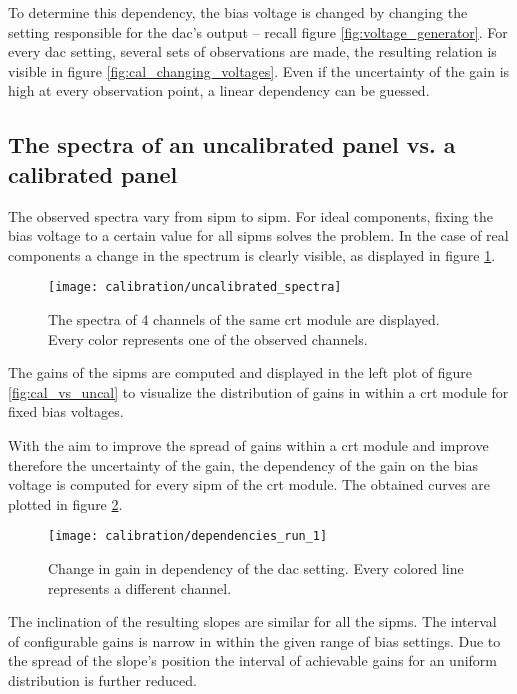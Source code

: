 To determine this dependency, the bias voltage is changed by changing the setting responsible for the \gls{dac}'s output -- recall figure \ref{fig:voltage_generator}.
For every \gls{dac} setting, several sets of observations are made, the resulting relation is visible in figure \ref{fig:cal_changing_voltages}.
Even if the uncertainty of the gain is high at every observation point, a linear dependency can be guessed.

\subsection{The spectra of an uncalibrated panel vs. a calibrated panel}

The observed spectra vary from \gls{sipm} to \gls{sipm}.
For ideal components, fixing the bias voltage to a certain value for all \glspl{sipm} solves the problem.
In the case of real components a change in the spectrum is clearly visible, as displayed in figure \ref{fig:cal_uncalibrated_spectra}.

\begin{figure}
  \centering
  \texttt{[image: calibration/uncalibrated\_spectra]}
  \caption{%
    The spectra of 4 channels of the same \gls{crt} module are displayed.
    Every color represents one of the observed channels.
  }
  \label{fig:cal_uncalibrated_spectra}
\end{figure}

The gains of the \glspl{sipm} are computed and displayed in the left plot of figure \ref{fig:cal_vs_uncal} to visualize the distribution of gains in within a \gls{crt} module for fixed bias voltages.

With the aim to improve the spread of gains within a \gls{crt} module and improve therefore the uncertainty of the gain, the dependency of the gain on the bias voltage is computed for every \gls{sipm} of the \gls{crt} module.
The obtained curves are plotted in figure \ref{fig:cal_dependencies}.

\begin{figure}
  \centering
  \texttt{[image: calibration/dependencies\_run\_1]}
  \caption{%
    Change in gain in dependency of the \gls{dac} setting.
    Every colored line represents a different channel.
  }
  \label{fig:cal_dependencies}
\end{figure}

The inclination of the resulting slopes are similar for all the \glspl{sipm}.
The interval of configurable gains is narrow in within the given range of bias settings.
Due to the spread of the slope's position the interval of achievable gains for an uniform distribution is further reduced.

